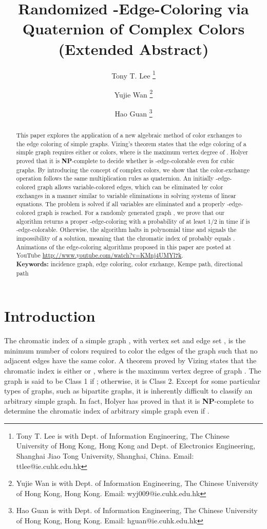 \documentclass[11pt]{article}
\title{Randomized -Edge-Coloring via Quaternion of Complex Colors\\ (Extended Abstract)}
\author{
	Tony T. Lee \footnote{Tony T. Lee is with Dept. of Information Engineering, The Chinese University of Hong Kong, Hong Kong and Dept. of Electronics Engineering, Shanghai Jiao Tong University, Shanghai, China. Email: ttlee@ie.cuhk.edu.hk }
	\and
	 Yujie Wan \footnote{Yujie Wan is with Dept. of Information Engineering, The Chinese University of Hong Kong, Hong Kong. Email: wyj009@ie.cuhk.edu.hk}
	\and 
	Hao Guan  \footnote{Hao Guan is with Dept. of Information Engineering, The Chinese University of Hong Kong, Hong Kong. Email: hguan@ie.cuhk.edu.hk}
}
\begin{document}
\maketitle 

\begin{abstract}
	This paper explores the application of a new algebraic method of color exchanges to the edge coloring of simple graphs. Vizing's theorem states that the edge coloring of a simple graph  requires either  or  colors, where  is the maximum vertex degree of . Holyer proved that it is {\bf NP}-complete to decide whether  is -edge-colorable even for cubic graphs. By introducing the concept of complex colors, we show that the color-exchange operation follows the same multiplication rules as quaternion. An initially -edge-colored graph  allows variable-colored edges, which can be eliminated by color exchanges in a manner similar to variable eliminations in solving systems of linear equations. The problem is solved if all variables are eliminated and a properly -edge-colored graph is reached. For a randomly generated graph , we prove that our algorithm returns a proper -edge-coloring with a probability of at least 1/2 in  time if  is -edge-colorable. Otherwise, the algorithm halts in polynomial time and signals the impossibility of a solution, meaning that the chromatic index of  probably equals . Animations of the edge-coloring algorithms proposed in this paper are posted at YouTube \url{http://www.youtube.com/watch?v=KMnj4UMYl7k}.\\
\textbf{Keywords:} incidence graph, edge coloring, color exchange, Kempe path, directional path
\end{abstract}



\section{Introduction}


The chromatic index   of a simple graph , with vertex set  and edge set , is the minimum number of colors required to color the edges of the graph such that no adjacent edges have the same color. A theorem proved by Vizing \cite{west2001introduction} states that the chromatic index is either  or , where  is the maximum vertex degree of graph . The graph  is said to be Class 1 if ; otherwise, it is Class 2. Except for some particular types of graphs, such as bipartite graphs, it is inherently difficult to classify an arbitrary simple graph. In fact, Holyer has proved in \cite{holyer1981np} that it is {\bf NP}-complete to determine the chromatic index of arbitrary simple graph even if . 
\end{document}
